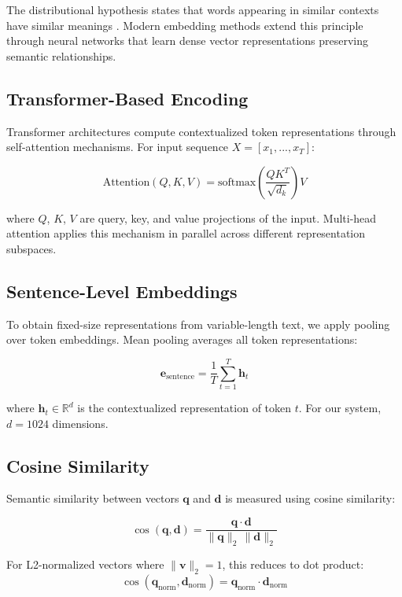 The distributional hypothesis states that words appearing in similar contexts have similar meanings \cite{harris1954distributional}. Modern embedding methods extend this principle through neural networks that learn dense vector representations preserving semantic relationships.

\subsection{Transformer-Based Encoding}

Transformer architectures \cite{vaswani2017attention} compute contextualized token representations through self-attention mechanisms. For input sequence $X = [x_1, ..., x_T]$:

\[
\text{Attention}(Q, K, V) = \text{softmax}\left(\frac{QK^T}{\sqrt{d_k}}\right)V
\]

where $Q$, $K$, $V$ are query, key, and value projections of the input. Multi-head attention applies this mechanism in parallel across different representation subspaces.

\subsection{Sentence-Level Embeddings}

To obtain fixed-size representations from variable-length text, we apply pooling over token embeddings. Mean pooling averages all token representations:

\[
\mathbf{e}_{\text{sentence}} = \frac{1}{T} \sum_{t=1}^{T} \mathbf{h}_t
\]

where $\mathbf{h}_t \in \mathbb{R}^{d}$ is the contextualized representation of token $t$. For our system, $d = 1024$ dimensions.

\subsection{Cosine Similarity}

Semantic similarity between vectors $\mathbf{q}$ and $\mathbf{d}$ is measured using cosine similarity:

\[
\cos(\mathbf{q}, \mathbf{d}) = \frac{\mathbf{q} \cdot \mathbf{d}}{\|\mathbf{q}\|_2 \, \|\mathbf{d}\|_2}
\]

For L2-normalized vectors where $\|\mathbf{v}\|_2 = 1$, this reduces to dot product:
\[
\cos(\mathbf{q}_{\text{norm}}, \mathbf{d}_{\text{norm}}) = \mathbf{q}_{\text{norm}} \cdot \mathbf{d}_{\text{norm}}
\]

